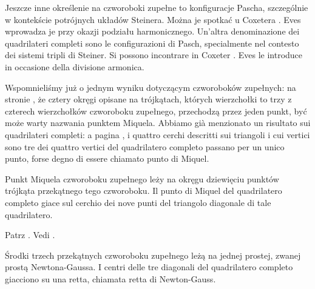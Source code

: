 Jeszcze inne określenie na czworoboki zupełne to konfiguracje Pascha, szczególnie w kontekście potrójnych układów Steinera. %
Można je spotkać u Coxetera \cite[s. 34]{coxeter_1967}. %
Eves \cite[s. 84]{eves1_1972} wprowadza je przy okazji podziału harmonicznego. %
Un'altra denominazione dei quadrilateri completi sono le configurazioni di Pasch, specialmente nel contesto dei sistemi tripli di Steiner. %
Si possono incontrare in Coxeter \cite[p. 34]{coxeter_1967}. %
Eves \cite[p. 84]{eves1_1972} le introduce in occasione della divisione armonica. %

Wspomnieliśmy już o jednym wyniku dotyczącym czworoboków zupełnych: na stronie \pageref{miquel_to_tez_cztery_okregi}, że cztery okręgi opisane na trójkątach, których wierzchołki to trzy z czterech wierzchołków czworoboku zupełnego, przechodzą przez jeden punkt, być może warty nazwania punktem Miquela. %
Abbiamo già menzionato un risultato sui quadrilateri completi: a pagina \pageref{miquel_to_tez_cztery_okregi}, i quattro cerchi descritti sui triangoli i cui vertici sono tre dei quattro vertici del quadrilatero completo passano per un unico punto, forse degno di essere chiamato punto di Miquel. %

\begin{theorem}
[Jemieljanowa] %
[di Emelyanov] %
Punkt Miquela czworoboku zupełnego leży na okręgu dziewięciu punktów trójkąta przekątnego tego czworoboku. %
Il punto di Miquel del quadrilatero completo giace sul cerchio dei nove punti del triangolo diagonale di tale quadrilatero. %
\end{theorem}

Patrz \cite[s. 262]{neugebauer_2018}. %
Vedi \cite[p. 262]{neugebauer_2018}. %


\begin{theorem}
[Newtona-Gaussa] %
[di Newton-Gauss] %
Środki trzech przekątnych czworoboku zupełnego leżą na jednej prostej, zwanej prostą Newtona-Gaussa. %
I centri delle tre diagonali del quadrilatero completo giacciono su una retta, chiamata retta di Newton-Gauss. %
\end{theorem}

